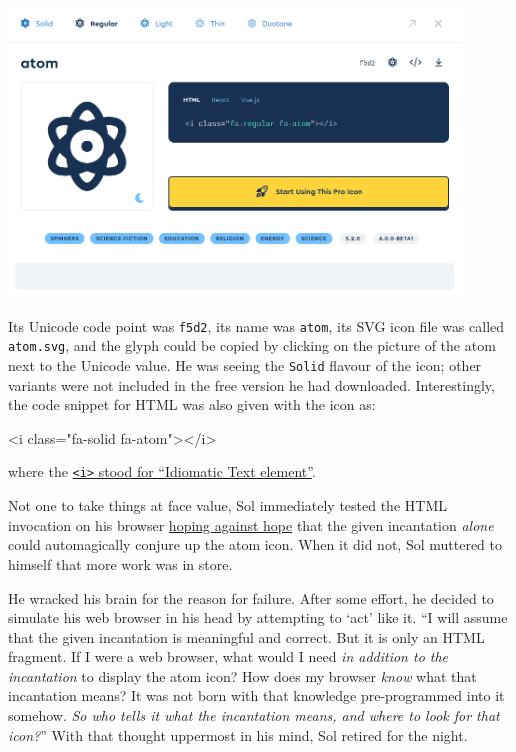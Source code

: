 \documentclass[
  british,
  a4paper,
  rgb,
  dvipsnames,
  svgnames,
  hyphens]{article}
\newenvironment{Shaded}{\begin{snugshade}}{\end{snugshade}}
\newcommand{\ErrorTok}[1]{\textcolor[rgb]{0.76,0.75,0.62}{#1}}
\newcommand{\KeywordTok}[1]{\textcolor[rgb]{0.94,0.87,0.69}{#1}}
\newcommand{\OtherTok}[1]{\textcolor[rgb]{0.94,0.94,0.56}{#1}}
\newcommand{\StringTok}[1]{\textcolor[rgb]{0.80,0.58,0.58}{#1}}
\begin{document}
\includegraphics[width=0.9\textwidth,height=\textheight]{images/atom.png}

Its Unicode code point was \texttt{f5d2}, its name was \texttt{atom},
its SVG icon file was called \texttt{atom.svg}, and the glyph could be
copied by clicking on the picture of the atom next to the Unicode value.
He was seeing the \texttt{Solid} flavour of the icon; other variants
were not included in the free version he had downloaded. Interestingly,
the code snippet for HTML was also given with the icon as:

\begin{Shaded}
\begin{Highlighting}[]
\KeywordTok{\textless{}i} \ErrorTok{class}\OtherTok{=}\StringTok{"fa{-}solid fa{-}atom"}\KeywordTok{\textgreater{}\textless{}/i\textgreater{}}
\end{Highlighting}
\end{Shaded}

where the
\href{https://developer.mozilla.org/en-US/docs/Web/HTML/Element/i}{\texttt{\textless{}i\textgreater{}}
stood for ``Idiomatic Text element''}.

Not one to take things at face value, Sol immediately tested the HTML
invocation on his browser
\href{https://www.thefreedictionary.com/hoping+against+hope}{hoping
against hope} that the given incantation \emph{alone} could
automagically conjure up the atom icon. When it did not, Sol muttered to
himself that more work was in store.

He wracked his brain for the reason for failure. After some effort, he
decided to simulate his web browser in his head by attempting to `act'
like it. ``I will assume that the given incantation is meaningful and
correct. But it is only an HTML fragment. If I were a web browser, what
would I need \emph{in addition to the incantation} to display the atom
icon? How does my browser \emph{know} what that incantation means? It
was not born with that knowledge pre-programmed into it somehow.
\emph{So who tells it what the incantation means, and where to look for
that icon?}'' With that thought uppermost in his mind, Sol retired for
the night.
\end{document}
